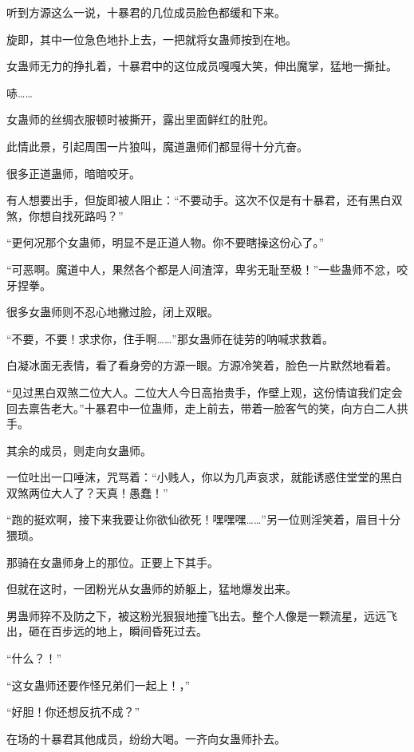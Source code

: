 
\begin{this_body}

听到方源这么一说，十暴君的几位成员脸色都缓和下来。

旋即，其中一位急色地扑上去，一把就将女蛊师按到在地。

女蛊师无力的挣扎着，十暴君中的这位成员嘎嘎大笑，伸出魔掌，猛地一撕扯。

哧……

女蛊师的丝绸衣服顿时被撕开，露出里面鲜红的肚兜。

此情此景，引起周围一片狼叫，魔道蛊师们都显得十分亢奋。

很多正道蛊师，暗暗咬牙。

有人想要出手，但旋即被人阻止：“不要动手。这次不仅是有十暴君，还有黑白双煞，你想自找死路吗？”

“更何况那个女蛊师，明显不是正道人物。你不要瞎操这份心了。”

“可恶啊。魔道中人，果然各个都是人间渣滓，卑劣无耻至极！”一些蛊师不忿，咬牙捏拳。

很多女蛊师则不忍心地撇过脸，闭上双眼。

“不要，不要！求求你，住手啊……”那女蛊师在徒劳的呐喊求救着。

白凝冰面无表情，看了看身旁的方源一眼。方源冷笑着，脸色一片默然地看着。

“见过黑白双煞二位大人。二位大人今日高抬贵手，作壁上观，这份情谊我们定会回去禀告老大。”十暴君中一位蛊师，走上前去，带着一脸客气的笑，向方白二人拱手。

其余的成员，则走向女蛊师。

一位吐出一口唾沫，咒骂着：“小贱人，你以为几声哀求，就能诱惑住堂堂的黑白双煞两位大人了？天真！愚蠢！”

“跑的挺欢啊，接下来我要让你欲仙欲死！嘿嘿嘿……”另一位则淫笑着，眉目十分猥琐。

那骑在女蛊师身上的那位。正要上下其手。

但就在这时，一团粉光从女蛊师的娇躯上，猛地爆发出来。

男蛊师猝不及防之下，被这粉光狠狠地撞飞出去。整个人像是一颗流星，远远飞出，砸在百步远的地上，瞬间昏死过去。

“什么？！”

“这女蛊师还要作怪兄弟们一起上！，”

“好胆！你还想反抗不成？”

在场的十暴君其他成员，纷纷大喝。一齐向女蛊师扑去。


\end{this_body}
